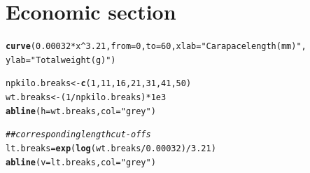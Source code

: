 \documentclass[12pt]{article}\usepackage[]{graphicx}\usepackage[]{color}
\makeatletter
\newcommand{\hlnum}[1]{\textcolor[rgb]{0.686,0.059,0.569}{#1}}%
\newcommand{\hlstr}[1]{\textcolor[rgb]{0.192,0.494,0.8}{#1}}%
\newcommand{\hlcom}[1]{\textcolor[rgb]{0.678,0.584,0.686}{\textit{#1}}}%
\newcommand{\hlopt}[1]{\textcolor[rgb]{0,0,0}{#1}}%
\newcommand{\hlstd}[1]{\textcolor[rgb]{0.345,0.345,0.345}{#1}}%
\newcommand{\hlkwb}[1]{\textcolor[rgb]{0.69,0.353,0.396}{#1}}%
\newcommand{\hlkwc}[1]{\textcolor[rgb]{0.333,0.667,0.333}{#1}}%
\newcommand{\hlkwd}[1]{\textcolor[rgb]{0.737,0.353,0.396}{\textbf{#1}}}%
\newenvironment{kframe}{%
 \def\at@end@of@kframe{}%
 \ifinner\ifhmode%
  \def\at@end@of@kframe{\end{minipage}}%
  \begin{minipage}{\columnwidth}%
 \fi\fi%
 \def\FrameCommand##1{\hskip\@totalleftmargin \hskip-\fboxsep
 \colorbox{shadecolor}{##1}\hskip-\fboxsep
     \hskip-\linewidth \hskip-\@totalleftmargin \hskip\columnwidth}%
 \MakeFramed {\advance\hsize-\width
   \@totalleftmargin\z@ \linewidth\hsize
   \@setminipage}}%
 {\par\unskip\endMakeFramed%
 \at@end@of@kframe}
\newenvironment{knitrout}{}{} %
\makeatother
\begin{document}
\section{Economic section}

\begin{knitrout}\footnotesize
{}\color{fgcolor}\begin{kframe}
\begin{alltt}
\hlkwd{curve}\hlstd{(}\hlnum{0.00032} \hlopt{*} \hlstd{x}\hlopt{^}\hlnum{3.21}\hlstd{,} \hlkwc{from} \hlstd{=} \hlnum{0}\hlstd{,} \hlkwc{to} \hlstd{=} \hlnum{60}\hlstd{,} \hlkwc{xlab} \hlstd{=} \hlstr{"Carapace length (mm)"}\hlstd{,}
      \hlkwc{ylab} \hlstd{=} \hlstr{"Total weight (g)"}\hlstd{)}

\hlstd{npkilo.breaks} \hlkwb{<-} \hlkwd{c}\hlstd{(}\hlnum{1}\hlstd{,} \hlnum{11}\hlstd{,} \hlnum{16}\hlstd{,} \hlnum{21}\hlstd{,} \hlnum{31}\hlstd{,} \hlnum{41}\hlstd{,} \hlnum{50}\hlstd{)}
\hlstd{wt.breaks} \hlkwb{<-} \hlstd{(}\hlnum{1}\hlopt{/} \hlstd{npkilo.breaks)} \hlopt{*} \hlnum{1e3}
\hlkwd{abline}\hlstd{(}\hlkwc{h} \hlstd{= wt.breaks,} \hlkwc{col} \hlstd{=} \hlstr{"grey"}\hlstd{)}

\hlcom{## corresponding length cut-offs}
\hlstd{lt.breaks} \hlkwb{=} \hlkwd{exp}\hlstd{(}\hlkwd{log}\hlstd{(wt.breaks} \hlopt{/} \hlnum{0.00032}\hlstd{)}\hlopt{/}\hlnum{3.21}\hlstd{)}
\hlkwd{abline}\hlstd{(}\hlkwc{v} \hlstd{= lt.breaks,} \hlkwc{col} \hlstd{=} \hlstr{"grey"}\hlstd{)}


\end{alltt}
\end{kframe}
\end{knitrout}
\end{document}
